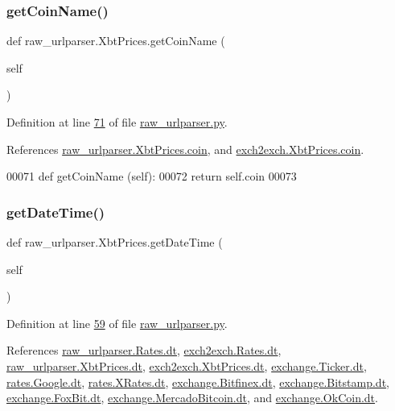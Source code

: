 \subsubsection{\texorpdfstring{get\+Coin\+Name()}{getCoinName()}}
{\footnotesize\ttfamily def raw\+\_\+urlparser.\+Xbt\+Prices.\+get\+Coin\+Name (\begin{DoxyParamCaption}\item[{}]{self }\end{DoxyParamCaption})}



Definition at line \hyperlink{raw__urlparser_8py_source_l00071}{71} of file \hyperlink{raw__urlparser_8py_source}{raw\+\_\+urlparser.\+py}.



References \hyperlink{raw__urlparser_8py_source_l00057}{raw\+\_\+urlparser.\+Xbt\+Prices.\+coin}, and \hyperlink{exch2exch_8py_source_l00065}{exch2exch.\+Xbt\+Prices.\+coin}.


\begin{DoxyCode}
00071     \textcolor{keyword}{def }getCoinName (self):
00072         \textcolor{keywordflow}{return} self.coin
00073 
\end{DoxyCode}
\mbox{\label{classraw__urlparser_1_1_xbt_prices_a0e29f458ee5bd80b2dfff3b0f08277f5}} 
\subsubsection{\texorpdfstring{get\+Date\+Time()}{getDateTime()}}
{\footnotesize\ttfamily def raw\+\_\+urlparser.\+Xbt\+Prices.\+get\+Date\+Time (\begin{DoxyParamCaption}\item[{}]{self }\end{DoxyParamCaption})}



Definition at line \hyperlink{raw__urlparser_8py_source_l00059}{59} of file \hyperlink{raw__urlparser_8py_source}{raw\+\_\+urlparser.\+py}.



References \hyperlink{raw__urlparser_8py_source_l00024}{raw\+\_\+urlparser.\+Rates.\+dt}, \hyperlink{exch2exch_8py_source_l00028}{exch2exch.\+Rates.\+dt}, \hyperlink{raw__urlparser_8py_source_l00053}{raw\+\_\+urlparser.\+Xbt\+Prices.\+dt}, \hyperlink{exch2exch_8py_source_l00057}{exch2exch.\+Xbt\+Prices.\+dt}, \hyperlink{exchange_8py_source_l00059}{exchange.\+Ticker.\+dt}, \hyperlink{rates_8py_source_l00089}{rates.\+Google.\+dt}, \hyperlink{rates_8py_source_l00145}{rates.\+X\+Rates.\+dt}, \hyperlink{exchange_8py_source_l00437}{exchange.\+Bitfinex.\+dt}, \hyperlink{exchange_8py_source_l00509}{exchange.\+Bitstamp.\+dt}, \hyperlink{exchange_8py_source_l00573}{exchange.\+Fox\+Bit.\+dt}, \hyperlink{exchange_8py_source_l00649}{exchange.\+Mercado\+Bitcoin.\+dt}, and \hyperlink{exchange_8py_source_l00714}{exchange.\+Ok\+Coin.\+dt}.


